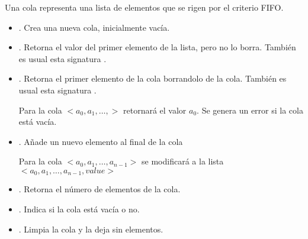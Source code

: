 

\begin{definition}[Cola]{}\label{def:Cola}

Una cola representa una lista de elementos que se rigen por el criterio FIFO.

\begin{itemize}
\item {}. Crea una nueva cola, inicialmente vacía.

\item {}. Retorna el valor del primer elemento de la lista, pero no lo borra.  También es usual esta signatura .

\item {}. Retorna el primer elemento de la cola borrandolo de la cola. También es usual esta signatura  .

Para la cola  $<a_0, a_1, \ldots,>$ retornará el valor $a_0$.
Se genera un error si la cola está vacía.

\item {}.
Añade un nuevo elemento al final de la cola

Para la cola  $<a_0, a_1, \ldots, a_{n-1}>$ 
se modificará a la lista $<a_0, a_1, \ldots, a_{n-1}, value>$ 

\item {}. Retorna el número de elementos de la cola.

\item {}. Indica si la cola está vacía o no.

\item {}. Limpia la cola y la deja sin elementos.

\end{itemize}
\end{definition}

